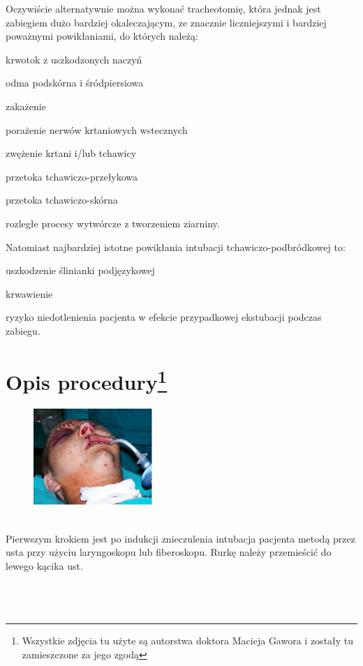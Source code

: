 \documentclass[a4paper, 12pt]{report}
\begin{document}
Oczywiście alternatywnie można wykonać tracheotomię, która jednak jest
zabiegiem dużo bardziej okaleczającym, ze znacznie liczniejszymi i
bardziej poważnymi powikłaniami, do których należą:
\begin{inparaenum}
\item krwotok z uszkodzonych naczyń
\item odma podskórna i śródpiersiowa
\item zakażenie
\item porażenie nerwów krtaniowych wstecznych
\item zwężenie krtani i/lub tchawicy
\item przetoka tchawiczo-przełykowa
\item przetoka tchawiczo-skórna
\item rozległe procesy wytwórcze z tworzeniem ziarniny.
\end{inparaenum}

Natomiast najbardziej istotne powikłania intubacji
tchawiczo-podbródkowej to:
\begin{inparaenum}
\item uszkodzenie ślinianki podjęzykowej
\item krwawienie
\item ryzyko niedotlenienia pacjenta w efekcie przypadkowej ekstubacji
  podczas zabiegu.
\end{inparaenum}


\section*{Opis procedury\footnote{Wszystkie zdjęcia tu użyte są
  autorstwa doktora Macieja Gawora i zostały tu zamieszczone za jego zgodą}}

\begin{figure}
\includegraphics[width=0.4\textwidth]{images/itp1}
\end{figure}
\hfill\\
Pierwszym krokiem jest po indukcji znieczulenia intubacja pacjenta
metodą przez usta przy użyciu laryngoskopu lub fiberoskopu. Rurkę
należy przemieścić do lewego kącika ust.
\hfill\\
\hfill\\
\hfill\\
\hfill\\
\end{document}
